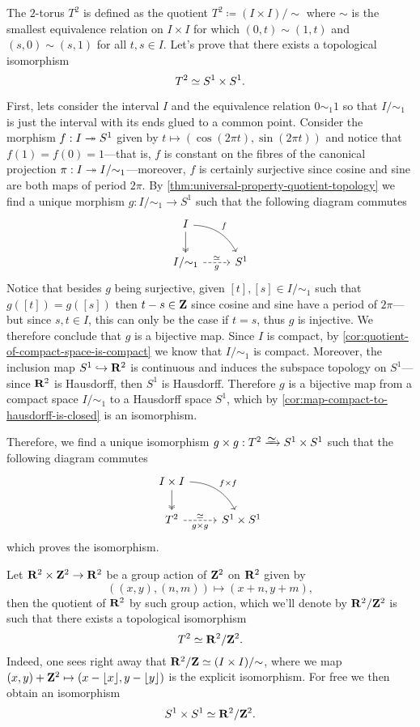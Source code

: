 \begin{example}[Torus \(T^2\)]
\label{exp:T2-isomorphic-S1*S1}
The \(2\)-torus \(T^2\) is defined as the quotient
\(T^2 \coloneq (I \times I)/{\sim}\) where \(\sim\) is the smallest equivalence
relation on \(I \times I\) for which \((0, t) \sim (1, t)\) and
\((s, 0) \sim (s, 1)\) for all \(t, s \in I\). Let's prove that there exists a
topological isomorphism
\[
T^2 \simeq S^1 \times S^1.
\]

First, lets consider the interval \(I\) and the equivalence relation
\(0 \sim_1 1\) so that \(I/{\sim_1}\) is just the interval with its ends glued
to a common point. Consider the morphism \(f: I \twoheadrightarrow S^1\) given by
\(t \mapsto (\cos(2 \pi t), \sin(2 \pi t))\) and notice that
\(f(1) = f(0) = 1\)---that is, \(f\) is constant on the fibres of the canonical
projection \(\pi: I \twoheadrightarrow I/{\sim_1}\)---moreover, \(f\) is certainly surjective
since cosine and sine are both maps of period \(2 \pi\). By
\cref{thm:universal-property-quotient-topology} we find a unique morphism
\(g: I/{\sim_1} \to S^1\) such that the following diagram commutes
\[
\begin{tikzcd}
I \ar[d, two heads] \ar[rd, bend left, "f"] & \\
I/{\sim_1} \ar[r, dashed, "\dis", "g"']     &S^1
\end{tikzcd}
\]
Notice that besides \(g\) being surjective, given \([t], [s] \in I/{\sim_1}\)
such that \(g([t]) = g([s])\) then \(t - s \in \mathbf{Z}\) since cosine and sine have a
period of \(2 \pi\)---but since \(s, t \in I\), this can only be the case if
\(t = s\), thus \(g\) is injective. We therefore conclude that \(g\) is a
bijective map. Since \(I\) is compact, by
\cref{cor:quotient-of-compact-space-is-compact} we know that \(I/{\sim_1}\) is
compact. Moreover, the inclusion map \(S^1 \hookrightarrow \mathbf{R}^2\) is continuous and induces
the subspace topology on \(S^1\)---since \(\mathbf{R}^2\) is Hausdorff, then \(S^1\)
is Hausdorff. Therefore \(g\) is a bijective map from a compact space
\(I/{\sim_1}\) to a Hausdorff space \(S^1\), which by
\cref{cor:map-compact-to-hausdorff-is-closed} is an isomorphism.

Therefore, we find a unique isomorphism
\(g \times g: T^2 \isoto S^1 \times S^1\) such that the following diagram
commutes
\[
\begin{tikzcd}
I \times I \ar[d, two heads] \ar[rd, bend left, "f \times f"] & \\
T^2 \ar[r, dashed, "\dis", "g \times g"']                     &S^1 \times S^1
\end{tikzcd}
\]
which proves the isomorphism.

Let \(\mathbf{R}^2 \times \mathbf{Z}^2 \to \mathbf{R}^2\) be a group action of \(\mathbf{Z}^2\) on \(\mathbf{R}^2\)
given by
\[
((x, y), (n, m)) \mapsto (x + n, y + m),
\]
then the quotient of \(\mathbf{R}^2\) by such group action, which we'll denote by
\(\mathbf{R}^2/\mathbf{Z}^2\) is such that there exists a topological isomorphism
\[
T^2 \simeq \mathbf{R}^2/\mathbf{Z}^2.
\]
Indeed, one sees right away that \(\mathbf{R}^2/\mathbf{Z} \simeq (I \times I)/{\sim}\), where we
map \((x, y) + \mathbf{Z}^2 \mapsto (x - \lfloor x \rfloor, y - \lfloor y \rfloor)\) is
the explicit isomorphism. For free we then obtain an isomorphism
\[
S^1 \times S^1 \simeq \mathbf{R}^2/\mathbf{Z}^2.
\]
\end{example}

